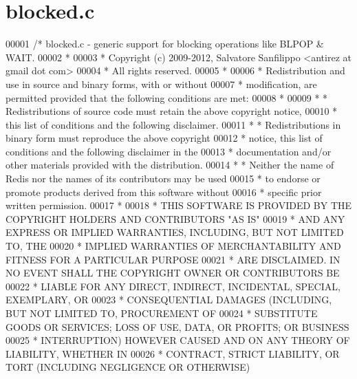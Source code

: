 \hypertarget{blocked_8c_source}{}\section{blocked.\+c}
\label{blocked_8c_source}

\begin{DoxyCode}
00001 \textcolor{comment}{/* blocked.c - generic support for blocking operations like BLPOP & WAIT.}
00002 \textcolor{comment}{ *}
00003 \textcolor{comment}{ * Copyright (c) 2009-2012, Salvatore Sanfilippo <antirez at gmail dot com>}
00004 \textcolor{comment}{ * All rights reserved.}
00005 \textcolor{comment}{ *}
00006 \textcolor{comment}{ * Redistribution and use in source and binary forms, with or without}
00007 \textcolor{comment}{ * modification, are permitted provided that the following conditions are met:}
00008 \textcolor{comment}{ *}
00009 \textcolor{comment}{ *   * Redistributions of source code must retain the above copyright notice,}
00010 \textcolor{comment}{ *     this list of conditions and the following disclaimer.}
00011 \textcolor{comment}{ *   * Redistributions in binary form must reproduce the above copyright}
00012 \textcolor{comment}{ *     notice, this list of conditions and the following disclaimer in the}
00013 \textcolor{comment}{ *     documentation and/or other materials provided with the distribution.}
00014 \textcolor{comment}{ *   * Neither the name of Redis nor the names of its contributors may be used}
00015 \textcolor{comment}{ *     to endorse or promote products derived from this software without}
00016 \textcolor{comment}{ *     specific prior written permission.}
00017 \textcolor{comment}{ *}
00018 \textcolor{comment}{ * THIS SOFTWARE IS PROVIDED BY THE COPYRIGHT HOLDERS AND CONTRIBUTORS "AS IS"}
00019 \textcolor{comment}{ * AND ANY EXPRESS OR IMPLIED WARRANTIES, INCLUDING, BUT NOT LIMITED TO, THE}
00020 \textcolor{comment}{ * IMPLIED WARRANTIES OF MERCHANTABILITY AND FITNESS FOR A PARTICULAR PURPOSE}
00021 \textcolor{comment}{ * ARE DISCLAIMED. IN NO EVENT SHALL THE COPYRIGHT OWNER OR CONTRIBUTORS BE}
00022 \textcolor{comment}{ * LIABLE FOR ANY DIRECT, INDIRECT, INCIDENTAL, SPECIAL, EXEMPLARY, OR}
00023 \textcolor{comment}{ * CONSEQUENTIAL DAMAGES (INCLUDING, BUT NOT LIMITED TO, PROCUREMENT OF}
00024 \textcolor{comment}{ * SUBSTITUTE GOODS OR SERVICES; LOSS OF USE, DATA, OR PROFITS; OR BUSINESS}
00025 \textcolor{comment}{ * INTERRUPTION) HOWEVER CAUSED AND ON ANY THEORY OF LIABILITY, WHETHER IN}
00026 \textcolor{comment}{ * CONTRACT, STRICT LIABILITY, OR TORT (INCLUDING NEGLIGENCE OR OTHERWISE)}

\end{DoxyCode}
